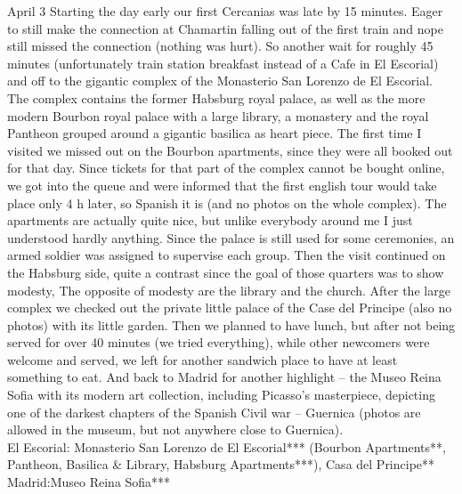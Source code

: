 April 3
Starting the day early our first Cercanias was late by 15 minutes. Eager to still make the connection at Chamartin falling out of the first train and nope still missed the connection (nothing was hurt). So another wait for roughly 45 minutes (unfortunately train station breakfast instead of a Cafe in El Escorial) and off to the gigantic complex of the Monasterio San Lorenzo de El Escorial. The complex contains the former Habsburg royal palace, as well as the more modern Bourbon royal palace with a large library, a monastery and the royal Pantheon grouped around a gigantic basilica as heart piece. The first time I visited we missed out on the Bourbon apartments, since they were all booked out for that day. Since tickets for that part of the complex cannot be bought online, we got into the queue and were informed that the first english tour would take place only 4 h later, so Spanish it is (and no photos on the whole complex). The apartments are actually quite nice, but unlike everybody around me I just understood hardly anything. Since the palace is still used for some ceremonies, an armed soldier was assigned to supervise each group. Then the visit continued on the Habsburg side, quite a contrast since the goal of those quarters was to show modesty, The opposite of modesty are the library and the church. After the large complex we checked out the private little palace of the Case del Principe (also no photos) with its little garden. Then we planned to have lunch, but after not being served for over 40 minutes (we tried everything), while other newcomers were welcome and served, we left for another sandwich place to have at least something to eat. And back to Madrid for another highlight -- the Museo Reina Sofia with its modern art collection, including Picasso's masterpiece, depicting one of the darkest chapters of the Spanish Civil war -- Guernica (photos are allowed in the museum, but not anywhere close to Guernica).\\

El Escorial:
Monasterio San Lorenzo de El Escorial*** (Bourbon Apartments**, Pantheon, Basilica \& Library, Habsburg Apartments***),
Casa del Principe**\\
Madrid:Museo Reina Sofia***\\


